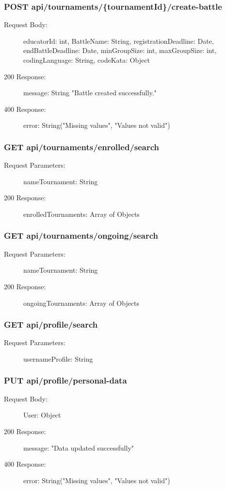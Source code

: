 \documentclass{Configuration_Files/Template}
\begin{document}
\subsubsection{POST api/tournaments/\{tournamentId\}/create-battle}
\begin{description}
    \item[Request Body:] educatorId: int, BattleName: String, registrationDeadline: Date, endBattleDeadline: Date, minGroupSize: int, maxGroupSize: int, codingLanguage: String, codeKata: Object
    \item[200 Response:] message: String "Battle created successfully."
    \item[400 Response:] error: String("Missing values", "Values not valid")
\end{description}

\subsubsection{GET api/tournaments/enrolled/search}
\begin{description}
    \item[Request Parameters:] nameTournament: String
    \item[200 Response:] enrolledTournaments: Array of Objects
\end{description}

\subsubsection{GET api/tournaments/ongoing/search}
\begin{description}
    \item[Request Parameters:] nameTournament: String
    \item[200 Response:] ongoingTournaments: Array of Objects
\end{description}

\subsubsection{GET api/profile/search}
\begin{description}
    \item[Request Parameters:] usernameProfile: String
\end{description}

\subsubsection{PUT api/profile/personal-data}
\begin{description}
    \item[Request Body:] User: Object
    \item[200 Response:] message: "Data updated successfully"
    \item[400 Response:] error: String("Missing values", "Values not valid")
\end{description}
\end{document}
